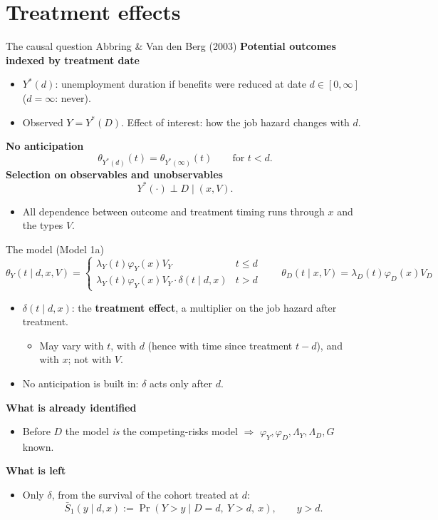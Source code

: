 \documentclass[aspectratio=169,10pt]{beamer}
\begin{document}
\section{Treatment effects}
\begin{frame}[label=m-causal]{The causal question \hfill {\small Abbring \& Van den Berg (2003)}}
  \textbf{Potential outcomes indexed by treatment date}
  \begin{itemize}
    \item $Y^*(d)$: unemployment duration if benefits were reduced at date $d\in[0,\infty]$ ($d=\infty$: never).
    \item Observed $Y=Y^*(D)$. Effect of interest: how the job hazard changes with $d$.
  \end{itemize}
  \textbf{No anticipation}
  \[ \theta_{Y^*(d)}(t)=\theta_{Y^*(\infty)}(t)\qquad\text{for } t<d. \]
  \textbf{Selection on observables and unobservables}
  \[ Y^*(\cdot)\perp D\mid(x,V). \]
  \begin{itemize}
    \item All dependence between outcome and treatment timing runs through $x$ and the types $V$.
  \end{itemize}
  \vfill\hfill\hyperlink{p-treat}{}
\end{frame}

\begin{frame}[label=m-treat]{The model (Model 1a)}
  \[ \theta_Y(t\mid d,x,V)=\begin{cases}\lambda_Y(t)\varphi_Y(x)V_Y & t\le d\\ \lambda_Y(t)\varphi_Y(x)V_Y\cdot\delta(t\mid d,x) & t>d\end{cases}\qquad \theta_D(t\mid x,V)=\lambda_D(t)\varphi_D(x)V_D \]
  \begin{itemize}
    \item $\delta(t\mid d,x)$: the \textbf{treatment effect}, a multiplier on the job hazard after treatment.
      \begin{itemize}
        \item May vary with $t$, with $d$ (hence with time since treatment $t-d$), and with $x$; not with $V$.
      \end{itemize}
    \item No anticipation is built in: $\delta$ acts only after $d$.
  \end{itemize}
  \medskip
  \textbf{What is already identified}
  \begin{itemize}
    \item Before $D$ the model \emph{is} the competing-risks model $\Rightarrow$ $\varphi_Y,\varphi_D,\Lambda_Y,\Lambda_D,G$ known.
  \end{itemize}
  \textbf{What is left}
  \begin{itemize}
    \item Only $\delta$, from the survival of the cohort treated at $d$:
      \[ \bar S_1(y\mid d,x):=\Pr(Y>y\mid D=d,\ Y>d,\ x),\qquad y>d. \]
  \end{itemize}
\end{frame}
\end{document}
